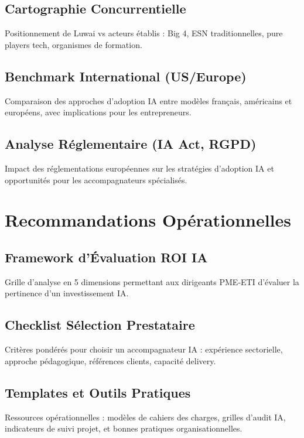 \documentclass[12pt,a4paper]{report}
\begin{document}
\section{Cartographie Concurrentielle}
Positionnement de Luwai vs acteurs établis : Big 4, ESN traditionnelles, pure players tech, organismes de formation.

\section{Benchmark International (US/Europe)}
Comparaison des approches d'adoption IA entre modèles français, américains et européens, avec implications pour les entrepreneurs.

\section{Analyse Réglementaire (IA Act, RGPD)}
Impact des réglementations européennes sur les stratégies d'adoption IA et opportunités pour les accompagnateurs spécialisés.

\chapter{Recommandations Opérationnelles}
\label{app:recommandations}

\section{Framework d'Évaluation ROI IA}
Grille d'analyse en 5 dimensions permettant aux dirigeants PME-ETI d'évaluer la pertinence d'un investissement IA.

\section{Checklist Sélection Prestataire}
Critères pondérés pour choisir un accompagnateur IA : expérience sectorielle, approche pédagogique, références clients, capacité delivery.

\section{Templates et Outils Pratiques}
Ressources opérationnelles : modèles de cahiers des charges, grilles d'audit IA, indicateurs de suivi projet, et bonnes pratiques organisationnelles.
\end{document}
